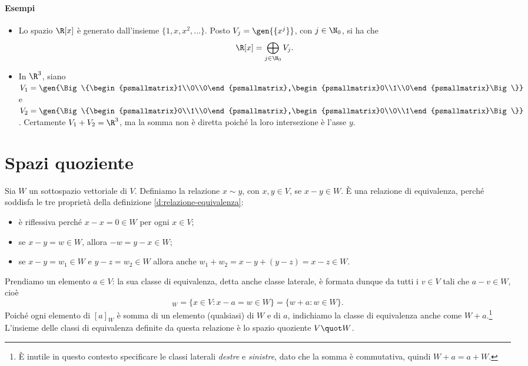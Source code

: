 \paragraph{Esempi}
\begin{itemize}
	\item Lo spazio $\R[x]$ è generato dall'insieme $\{1,x,x^2,\dots\}$.
		Posto $V_j=\gen{\{x^j\}}$, con $j\in\N_0$, si ha che
		\begin{equation*}
			\R[x]=\bigoplus_{j\in\N_0}V_j.
		\end{equation*}
	\item In $\R^3$, siano $V_1=\gen{\Big\{\begin{psmallmatrix}1\\0\\0\end{psmallmatrix},\begin{psmallmatrix}0\\1\\0\end{psmallmatrix}\Big\}}$ e $V_2=\gen{\Big\{\begin{psmallmatrix}0\\1\\0\end{psmallmatrix},\begin{psmallmatrix}0\\0\\1\end{psmallmatrix}\Big\}}$.
		Certamente $V_1+V_2=\R^3$, ma la somma non è diretta poiché la loro intersezione è l'asse $y$.
\end{itemize}

\section{Spazi quoziente} \label{sec:spazi_quoziente}
Sia $W$ un sottospazio vettoriale di $V$.
Definiamo la relazione $x\sim y$, con $x,y\in V$, se $x-y\in W$.
È una relazione di equivalenza, perché soddisfa le tre proprietà della definizione \ref{d:relazione-equivalenza}:
\begin{itemize}
	\item è riflessiva perch\'e $x-x=0\in W$ per ogni $x\in V$;
	\item se $x-y=w\in W$, allora $-w=y-x\in W$;
	\item se $x-y=w_1\in W$ e $y-z=w_2\in W$ allora anche $w_1+w_2=x-y+(y-z)=x-z\in W$.
\end{itemize}
Prendiamo un elemento $a\in V$: la sua classe di equivalenza, detta anche classe laterale, è formata dunque da tutti i $v\in V$ tali che $a-v\in W$, cioè
\begin{equation*}
	[a]_W=\{x\in V\colon x-a=w\in W\}=\{w+a\colon w\in W\}.
\end{equation*}
Poich\'e ogni elemento di $[a]_W$ è somma di un elemento (qualsiasi) di $W$ e di $a$, indichiamo la classe di equivalenza anche come $W+a$.\footnote{È inutile in questo contesto specificare le classi laterali \emph{destre} e \emph{sinistre}, dato che la somma è commutativa, quindi $W+a=a+W$.}
L'insieme delle classi di equivalenza definite da questa relazione è lo spazio quoziente $V\quot W$.

